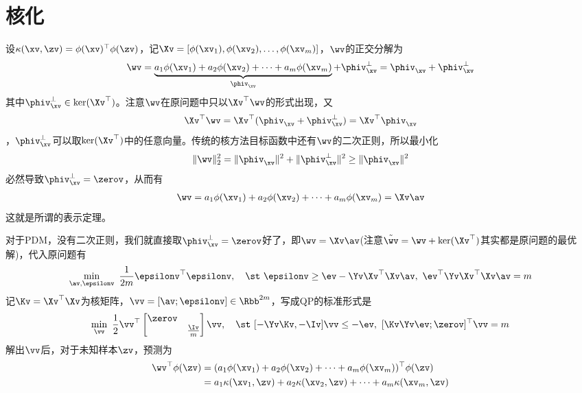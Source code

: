 \documentclass{ctexart}
\begin{document}
\section{核化}

设$\kappa (\xv, \zv) = \phi(\xv)^\top \phi(\zv)$，记$\Xv = [\phi(\xv_1), \phi(\xv_2), \ldots, \phi(\xv_m)]$，$\wv$的正交分解为
\begin{align*}
    \wv = \underbrace{a_1 \phi(\xv_1) + a_2 \phi(\xv_2) + \cdots + a_m \phi(\xv_m)}_{\phiv_{\xv}} + \phiv_{\xv}^\perp = \phiv_{\xv} + \phiv_{\xv}^\perp
\end{align*}
其中$\phiv_{\xv}^\perp \in \ker (\Xv^\top)$。注意$\wv$在原问题中只以$\Xv^\top \wv$的形式出现，又
\begin{align*}
    \Xv^\top \wv = \Xv^\top (\phiv_{\xv} + \phiv_{\xv}^\perp) = \Xv^\top \phiv_{\xv}
\end{align*}
，$\phiv_{\xv}^\perp$可以取$\ker (\Xv^\top)$中的任意向量。传统的核方法目标函数中还有$\wv$的二次正则，所以最小化
\begin{align*}
    \| \wv \|_2^2 = \| \phiv_{\xv} \|^2 + \| \phiv_{\xv}^\perp \|^2 \ge \| \phiv_{\xv} \|^2
\end{align*}
必然导致$\phiv_{\xv}^\perp = \zerov$，从而有
\begin{align*}
    \wv = a_1 \phi(\xv_1) + a_2 \phi(\xv_2) + \cdots + a_m \phi(\xv_m) = \Xv \av
\end{align*}
这就是所谓的表示定理。

对于PDM，没有二次正则，我们就直接取$\phiv_{\xv}^\perp = \zerov$好了，即$\wv = \Xv \av$(注意$\tilde{\wv} = \wv + \ker (\Xv^\top)$其实都是原问题的最优解)，代入原问题有
\begin{align*}
    \min_{\av, \epsilonv} ~ \frac{1}{2m} \epsilonv^\top \epsilonv, \quad \st ~ \epsilonv \ge \ev - \Yv \Xv^\top \Xv \av, ~ \ev^\top \Yv \Xv^\top \Xv \av = m
\end{align*}
记$\Kv = \Xv^\top \Xv$为核矩阵，$\vv = [\av; \epsilonv] \in \Rbb^{2m}$，写成QP的标准形式是
\begin{align*}
    \min_{\vv} ~ \frac{1}{2} \vv^\top \begin{bmatrix}
        \zerov \\ & \frac{\Iv}{m}
    \end{bmatrix} \vv, \quad \st ~ [- \Yv \Kv, -\Iv] \vv \le -\ev, ~ [\Kv \Yv \ev; \zerov]^\top \vv = m
\end{align*}
解出$\vv$后，对于未知样本$\zv$，预测为
\begin{align*}
    \wv^\top \phi(\zv) & = (a_1 \phi(\xv_1) + a_2 \phi(\xv_2) + \cdots + a_m \phi(\xv_m))^\top \phi(\zv)     \\
                       & = a_1 \kappa(\xv_1, \zv) + a_2 \kappa(\xv_2, \zv) + \cdots + a_m \kappa(\xv_m, \zv)
\end{align*}
\end{document}
